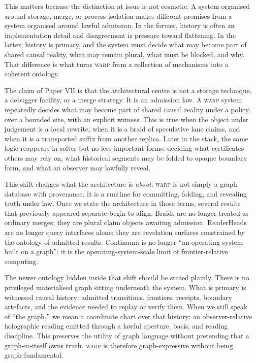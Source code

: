 \documentclass[11pt]{article}
\theoremstyle{definition}
\theoremstyle{plain}
\theoremstyle{remark}
\newcommand{\WARP}{\textsc{warp}}
\begin{document}
This matters because the distinction at issue is not cosmetic. A system organised around storage, merge, or process isolation makes different promises from a system organised around lawful admission. In the former, history is often an implementation detail and disagreement is pressure toward flattening. In the latter, history is primary, and the system must decide what may become part of shared causal reality, what may remain plural, what must be blocked, and why. That difference is what turns \WARP{} from a collection of mechanisms into a coherent ontology.

The claim of Paper VII is that the architectural centre is not a storage technique, a debugger facility, or a merge strategy. It is an admission law. A \WARP{} system repeatedly decides what may become part of shared causal reality under a policy, over a bounded site, with an explicit witness. This is true when the object under judgement is a local rewrite, when it is a braid of speculative lane claims, and when it is a transported suffix from another replica. Later in the stack, the same logic reappears in softer but no less important forms: deciding what certificates others may rely on, what historical segments may be folded to opaque boundary form, and what an observer may lawfully reveal.

This shift changes what the architecture is \emph{about}. \WARP{} is not simply a graph database with provenance. It is a runtime for committing, folding, and revealing truth under law. Once we state the architecture in those terms, several results that previously appeared separate begin to align. Braids are no longer treated as ordinary merges; they are plural claim objects awaiting admission. ReaderHeads are no longer query interfaces alone; they are revelation surfaces constrained by the ontology of admitted results. Continuum is no longer ``an operating system built on a graph''; it is the operating-system-scale limit of frontier-relative computing.

The newer ontology hidden inside that shift should be stated plainly. There is
no privileged materialised graph sitting underneath the system. What is primary
is witnessed causal history: admitted transitions, frontiers, receipts,
boundary artefacts, and the evidence needed to replay or verify them. When we
still speak of ``the graph,'' we mean a coordinate chart over that history: an
observer-relative holographic reading emitted through a lawful aperture,
basis, and reading discipline. This preserves the utility of graph language
without pretending that a graph-in-itself owns truth. \WARP{} is therefore
graph-expressive without being graph-fundamental.
\end{document}
